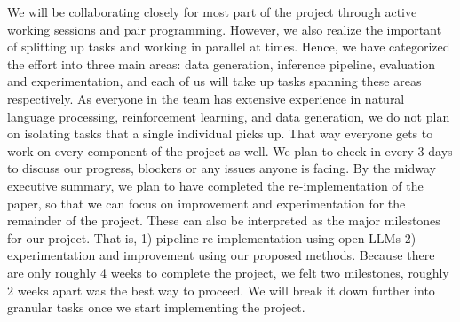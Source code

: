 \documentclass{article}
\begin{document}
We will be collaborating closely for most part of the project through active working sessions and pair programming. However, we also realize the important of splitting up tasks and working in parallel at times. Hence, we have categorized the effort into three main areas: data generation, inference pipeline, evaluation and experimentation, and each of us will take up tasks spanning these areas respectively. As everyone in the team has extensive experience in natural language processing, reinforcement learning, and data generation, we do not plan on isolating tasks that a single individual picks up. That way everyone gets to work on every component of the project as well. We plan to check in every 3 days to discuss our progress, blockers or any issues anyone is facing.
\noindent
By the midway executive summary, we plan to have completed the re-implementation of the paper, so that we can focus on improvement and experimentation for the remainder of the project. These can also be interpreted as the major milestones for our project. That is, 1) pipeline re-implementation using open LLMs 2) experimentation and improvement using our proposed methods. Because there are only roughly 4 weeks to complete the project, we felt two milestones, roughly 2 weeks apart was the best way to proceed. We will break it down further into  granular tasks once we start implementing the project.

\pagebreak



\end{document}
